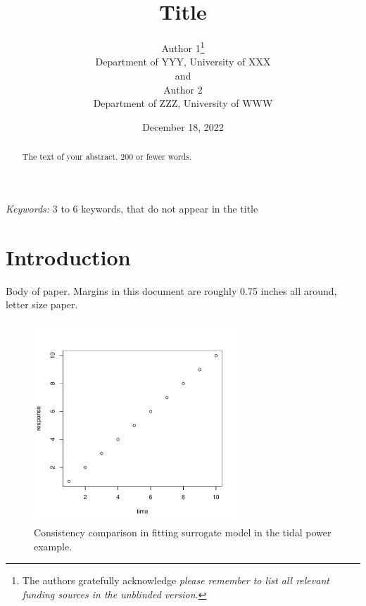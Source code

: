 \documentclass[
  12pt]{article}
\begin{document}
\def\spacingset#1{\renewcommand{\baselinestretch}%
{#1}\small\normalsize} \spacingset{1}



\date{December 18, 2022}
\title{\bf Title}
\author{
Author 1\thanks{The authors gratefully acknowledge \emph{please remember
to list all relevant funding sources in the unblinded version}.}\\
Department of YYY, University of XXX\\
and\\Author 2\\
Department of ZZZ, University of WWW\\
}
\maketitle

\bigskip
\bigskip
\begin{abstract}
The text of your abstract. 200 or fewer words.
\end{abstract}

\noindent%
{\it Keywords:} 3 to 6 keywords, that do not appear in the title
\vfill

\newpage
\spacingset{1.9} %
\ifdefined\Shaded\renewenvironment{Shaded}{\begin{tcolorbox}[breakable, sharp corners, borderline west={3pt}{0pt}{shadecolor}, enhanced, boxrule=0pt, frame hidden, interior hidden]}{\end{tcolorbox}}\fi

\hypertarget{sec-intro}{%
\section{Introduction}\label{sec-intro}}

Body of paper. Margins in this document are roughly 0.75 inches all
around, letter size paper.

\begin{figure}

{\centering \includegraphics[width=3in,height=\textheight]{fig1.pdf}

}

\caption{\label{fig-first}Consistency comparison in fitting surrogate
model in the tidal power example.}

\end{figure}
\end{document}
